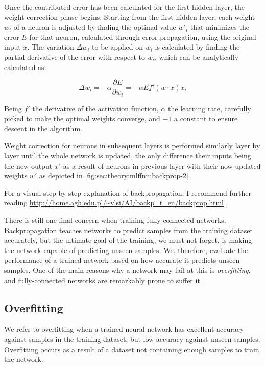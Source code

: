 Once the contributed error has been calculated for the first hidden layer, the weight correction phase begins.
Starting from the first hidden layer, each weight $w_i$ of a neuron is adjusted by finding the optimal value $w'_i$ that minimizes the error $E$ for that neuron, calculated through error propagation, using the original input $x$.
The variation $\Delta w_i$ to be applied on $w_i$ is calculated by finding the partial derivative of the error with respect to $w_i$, which can be analytically calculated \cite{Orr2008} as:

\begin{equation}
  \Delta w_i =
    -\alpha \frac{\partial E}{\partial w_i} =
    -\alpha E f'({w}\cdot{x}) x_i
\end{equation}

Being $f'$ the derivative of the activation function, $\alpha$ the learning rate, carefully picked to make the optimal weights converge, and $-1$ a constant to ensure descent in the algorithm.

Weight correction for neurons in subsequent layers is performed similarly layer by layer until the whole network is updated, the only difference their inputs being the new output $x'$ as a result of neurons in previous layer with their now updated weights $w'$ as depicted in \autoref{fig:sec:theory:mlffnn:backprop-2}.

For a visual step by step explanation of backpropagation, I recommend further reading \url{http://home.agh.edu.pl/~vlsi/AI/backp_t_en/backprop.html} \cite{Bernacki2005}.

There is still one final concern when training fully-connected networks.
Backpropagation teaches networks to predict samples from the training dataset accurately, but the ultimate goal of the training, we must not forget, is making the network capable of predicting unseen samples.
We, therefore, evaluate the performance of a trained network based on how accurate it predicts unseen samples.
One of the main reasons why a network may fail at this is \emph{overfitting}, and fully-connected networks are remarkably prone to suffer it.


\subsection{Overfitting}
\label{sec:theory:mlffnn:overfitting}

We refer to overfitting when a trained neural network has excellent accuracy against samples in the training dataset, but low accuracy against unseen samples.
Overfitting occurs as a result of a dataset not containing enough samples to train the network.

